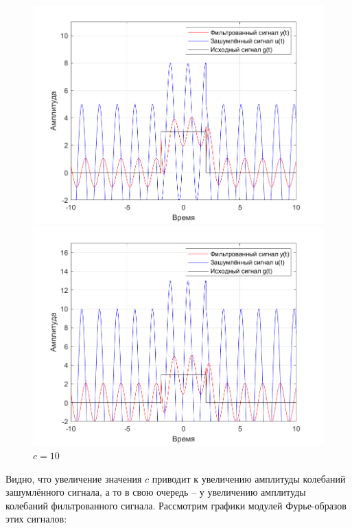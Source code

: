 \documentclass[a4paper]{article}
\begin{document}
\begin{figure}[H]
    \begin{minipage}{0.5\textwidth}
        \centering
        \includegraphics[width=\linewidth]{ex1_2/a1=0_a2=25_b1=10.5_b2=25_d=4_c=5/h2.png}
        \caption{$c=5$}
    \end{minipage}
    \begin{minipage}{0.5\textwidth}
        \centering
        \includegraphics[width=\linewidth]{ex1_2/a1=0_a2=25_b1=10.5_b2=25_d=4_c=10/h2.png}
        \caption{$c=10$}
    \end{minipage}
\end{figure}

Видно, что увеличение значения $c$ приводит к увеличению амплитуды колебаний зашумлённого сигнала, а то в свою очередь -- у увеличению амплитуды колебаний фильтрованного сигнала. Рассмотрим графики модулей Фурье-образов этих сигналов:
\end{document}
